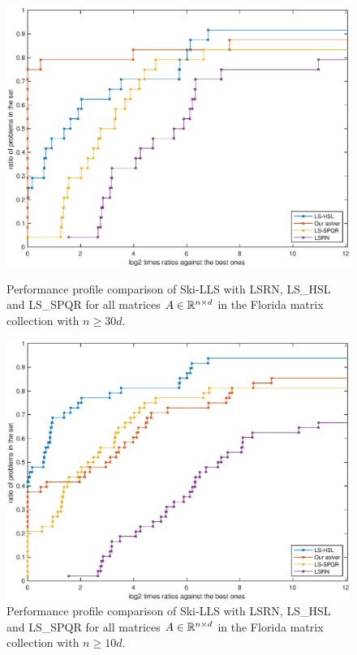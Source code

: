 \documentclass[english,11pt]{article}
\begin{document}
\renewcommand{\mysize}{0.42}
\begin{figure}[]
    \centering
    \begin{minipage}{\mysize\textwidth}
        \centering
        \includegraphics[width=\textwidth]{images/sparse_florida_all_30.eps} %
        \caption{Performance profile comparison of Ski-LLS with LSRN, LS_HSL and LS_SPQR for all matrices $A\in\mathbb{R}^{n\times d}$ in the Florida matrix collection with $n\geq 30d$. }
        \label{fig::all_solver_30}
    \end{minipage}\hfill  
    \centering
    \begin{minipage}{\mysize\textwidth}
        \centering
        \includegraphics[width=\textwidth]{images/sparse_florida_all_10.eps} %
        \caption{Performance profile comparison of Ski-LLS with LSRN, LS_HSL and LS_SPQR for all matrices $A\in\mathbb{R}^{n\times d}$ in the Florida matrix collection with $n\geq 10d$.}
        \label{fig::all_solver_10}
    \end{minipage}\hfill  
\end{figure}
\end{document}
